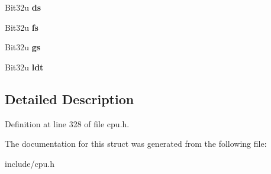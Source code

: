 \begin{DoxyCompactItemize}
\item 
\hypertarget{structTSS__32_a452bc114831435c75d740cf957f6f414}{Bit32u {\bfseries ds}}\label{structTSS__32_a452bc114831435c75d740cf957f6f414}

\item 
\hypertarget{structTSS__32_af8a7c7471dbd45b1d291387c506e8db9}{Bit32u {\bfseries fs}}\label{structTSS__32_af8a7c7471dbd45b1d291387c506e8db9}

\item 
\hypertarget{structTSS__32_a21cf303db8e7995ca443fd56b5a038d0}{Bit32u {\bfseries gs}}\label{structTSS__32_a21cf303db8e7995ca443fd56b5a038d0}

\item 
\hypertarget{structTSS__32_aaf2af37d72363e9b53627ad856942e39}{Bit32u {\bfseries ldt}}\label{structTSS__32_aaf2af37d72363e9b53627ad856942e39}

\end{DoxyCompactItemize}


\subsection{Detailed Description}


Definition at line 328 of file cpu.\-h.



The documentation for this struct was generated from the following file\-:\begin{DoxyCompactItemize}
\item 
include/cpu.\-h\end{DoxyCompactItemize}
